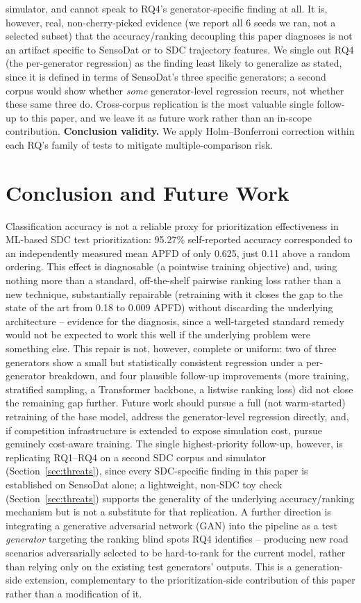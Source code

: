 \documentclass[smallextended]{svjour3}
\begin{document}
simulator, and cannot speak to RQ4's generator-specific finding at all.
It is, however, real, non-cherry-picked evidence (we report all 6 seeds
we ran, not a selected subset) that the accuracy/ranking decoupling this
paper diagnoses is not an artifact specific to SensoDat or to SDC
trajectory features. We single out RQ4 (the per-generator regression) as the finding least likely
to generalize as stated, since it is defined in terms of SensoDat's three
specific generators; a second corpus would show whether \emph{some}
generator-level regression recurs, not whether these same three do.
Cross-corpus replication is the most valuable single follow-up to this
paper, and we leave it as future work rather than an in-scope contribution.
\textbf{Conclusion validity.} We apply
Holm--Bonferroni correction within each RQ's family of tests to mitigate
multiple-comparison risk.

\section{Conclusion and Future Work}
Classification accuracy is not a reliable proxy for prioritization
effectiveness in ML-based SDC test prioritization: 95.27\% self-reported
accuracy corresponded to an independently measured mean APFD of only 0.625,
just 0.11 above a random ordering. This effect is diagnosable (a pointwise
training objective) and, using nothing more than a standard, off-the-shelf
pairwise ranking loss \citep{burges2005learning} rather than a new
technique, substantially repairable (retraining with it closes the gap to
the state of the art from 0.18 to 0.009 APFD) without discarding the
underlying architecture -- evidence for the diagnosis, since a
well-targeted standard remedy would not be expected to work this well if
the underlying problem were something else. This repair is not,
however, complete or uniform: two of three generators show a small but
statistically consistent regression under a per-generator breakdown, and
four plausible follow-up improvements (more training, stratified
sampling, a Transformer backbone, a listwise ranking loss)
did not close the remaining gap further. Future work should pursue a full
(not warm-started) retraining of the base model, address the
generator-level regression directly, and, if competition infrastructure is
extended to expose simulation cost, pursue genuinely cost-aware training.
The single highest-priority follow-up, however, is replicating RQ1--RQ4 on
a second SDC corpus and simulator (Section~\ref{sec:threats}), since every
SDC-specific finding in this paper is established on SensoDat alone; a
lightweight, non-SDC toy check (Section~\ref{sec:threats}) supports the
generality of the underlying accuracy/ranking mechanism but is not a
substitute for that replication. A further direction is integrating a
generative adversarial network (GAN) into the pipeline as a test
\emph{generator} targeting the ranking blind spots RQ4 identifies --
producing new road scenarios adversarially selected to be
hard-to-rank for the current model, rather than relying only on the
existing test generators' outputs. This is a generation-side extension,
complementary to the prioritization-side contribution of this paper
rather than a modification of it.
\end{document}
